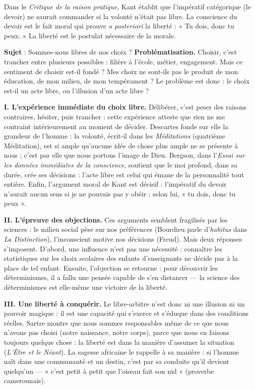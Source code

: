 \documentclass[11pt]{article}
\begin{document}
\begin{propriete}
Dans le \emph{Critique de la raison pratique}, Kant établit que l'impératif catégorique (le devoir) ne saurait commander si la volonté n'était pas libre. La conscience du devoir est le fait moral qui prouve \emph{a posteriori} la liberté : « Tu dois, donc tu peux. » La liberté est le postulat nécessaire de la morale.
\end{propriete}

\begin{exoresolu}
\textbf{Sujet} : Sommes-nous libres de nos choix ?
\tcblower
\textbf{Problématisation.} Choisir, c'est trancher entre plusieurs possibles : filière à l'école, métier, engagement. Mais ce sentiment de choisir est-il fondé ? Mes choix ne sont-ils pas le produit de mon éducation, de mon milieu, de mon tempérament ? Le problème est donc : le choix est-il un acte libre, ou l'illusion d'un acte libre ?

\textbf{I. L'expérience immédiate du choix libre.}
Délibérer, c'est peser des raisons contraires, hésiter, puis trancher : cette expérience atteste que rien ne me contraint intérieurement au moment de décider. Descartes fonde sur elle la grandeur de l'homme : la volonté, écrit-il dans les \emph{Méditations} (quatrième Méditation), est si ample qu'aucune idée de chose plus ample ne se présente à nous ; c'est par elle que nous portons l'image de Dieu. Bergson, dans l'\emph{Essai sur les données immédiates de la conscience}, soutient que le moi profond, dans sa durée, crée ses décisions : l'acte libre est celui qui émane de la personnalité tout entière. Enfin, l'argument moral de Kant est décisif : l'impératif du devoir n'aurait aucun sens si je ne pouvais pas y obéir ; selon lui, « tu dois, donc tu peux ».

\textbf{II. L'épreuve des objections.}
Ces arguments semblent fragilisés par les sciences : le milieu social pèse sur nos préférences (Bourdieu parle d'\emph{habitus} dans \emph{La Distinction}), l'inconscient motive nos décisions (Freud). Mais deux réponses s'imposent. D'abord, une influence n'est pas une nécessité : connaître les statistiques sur les choix scolaires des enfants d'enseignants ne décide pas à la place de tel enfant. Ensuite, l'objection se retourne : pour découvrir les déterminismes, il a fallu une pensée capable de s'en distancer — la science des déterminismes est elle-même une victoire de la liberté.

\textbf{III. Une liberté à conquérir.}
Le libre-arbitre n'est donc ni une illusion ni un pouvoir magique : il est une capacité qui s'exerce et s'éduque dans des conditions réelles. Sartre montre que nous sommes responsables même de ce que nous n'avons pas choisi (notre naissance, notre corps), parce que nous en faisons toujours quelque chose : la liberté est dans la manière d'assumer la situation (\emph{L'Être et le Néant}). La sagesse africaine le rappelle à sa manière : si l'homme naît dans une communauté et un destin, c'est par sa conduite qu'il devient quelqu'un — « c'est petit à petit que l'oiseau fait son nid » (proverbe camerounais).


\end{exoresolu}
\end{document}
